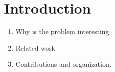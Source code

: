 \section{Introduction}\label{sec:Introduction}

\begin{enumerate}
	\item Why is the problem interesting
	\item Related work
	\item Contributions and organization.
\end{enumerate}
